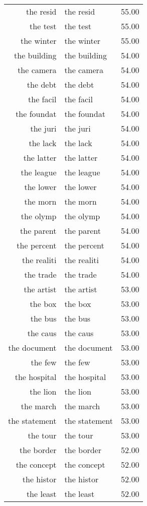 \begin{table}[ht]
\begin{tabular}{rlr}
  the resid & the resid & 55.00 \\ 
  the test & the test & 55.00 \\ 
  the winter & the winter & 55.00 \\ 
  the building & the building & 54.00 \\ 
  the camera & the camera & 54.00 \\ 
  the debt & the debt & 54.00 \\ 
  the facil & the facil & 54.00 \\ 
  the foundat & the foundat & 54.00 \\ 
  the juri & the juri & 54.00 \\ 
  the lack & the lack & 54.00 \\ 
  the latter & the latter & 54.00 \\ 
  the league & the league & 54.00 \\ 
  the lower & the lower & 54.00 \\ 
  the morn & the morn & 54.00 \\ 
  the olymp & the olymp & 54.00 \\ 
  the parent & the parent & 54.00 \\ 
  the percent & the percent & 54.00 \\ 
  the realiti & the realiti & 54.00 \\ 
  the trade & the trade & 54.00 \\ 
  the artist & the artist & 53.00 \\ 
  the box & the box & 53.00 \\ 
  the bus & the bus & 53.00 \\ 
  the caus & the caus & 53.00 \\ 
  the document & the document & 53.00 \\ 
  the few & the few & 53.00 \\ 
  the hospital & the hospital & 53.00 \\ 
  the lion & the lion & 53.00 \\ 
  the march & the march & 53.00 \\ 
  the statement & the statement & 53.00 \\ 
  the tour & the tour & 53.00 \\ 
  the border & the border & 52.00 \\ 
  the concept & the concept & 52.00 \\ 
  the histor & the histor & 52.00 \\ 
  the least & the least & 52.00 \\ 

\end{tabular}
\end{table}
